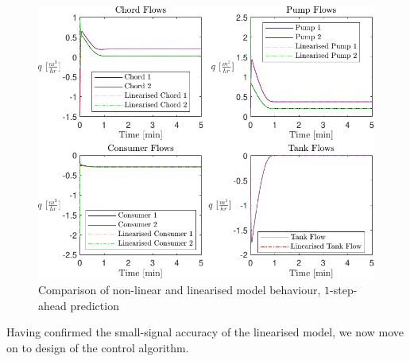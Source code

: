 \begin{figure}[h]
	\centering
	\includegraphics[width=\linewidth]{Graphics/NominalFlows.pdf}
	\caption{Comparison of non-linear and linearised model behaviour, $1$-step-ahead prediction}
	\label{fig:CompNonlinLin}
\end{figure}

Having confirmed the small-signal accuracy of the linearised model, we now move on to design of the control algorithm.